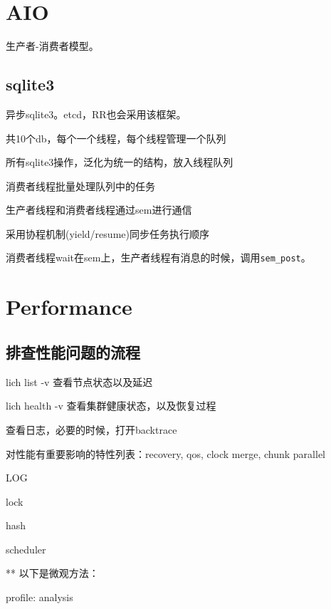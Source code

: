 \section{AIO}

生产者-消费者模型。

\subsection{sqlite3}

异步sqlite3。etcd，RR也会采用该框架。

\begin{compactitem}
\item 共10个db，每个一个线程，每个线程管理一个队列
\item 所有sqlite3操作，泛化为统一的结构，放入线程队列
\item 消费者线程批量处理队列中的任务
\item 生产者线程和消费者线程通过sem进行通信
\item 采用协程机制(yield/resume)同步任务执行顺序
\end{compactitem}

消费者线程wait在sem上，生产者线程有消息的时候，调用\verb|sem_post|。

\section{Performance}

\subsection{排查性能问题的流程}

\begin{enumbox}
\item lich list -v 查看节点状态以及延迟
\item lich health -v 查看集群健康状态，以及恢复过程
\item 查看日志，必要的时候，打开backtrace
\item 对性能有重要影响的特性列表：recovery, qos, clock merge, chunk parallel
\item LOG
\item lock
\item hash
\item scheduler
\item
\item *** 以下是微观方法：
\item profile: analysis
\end{enumbox}

